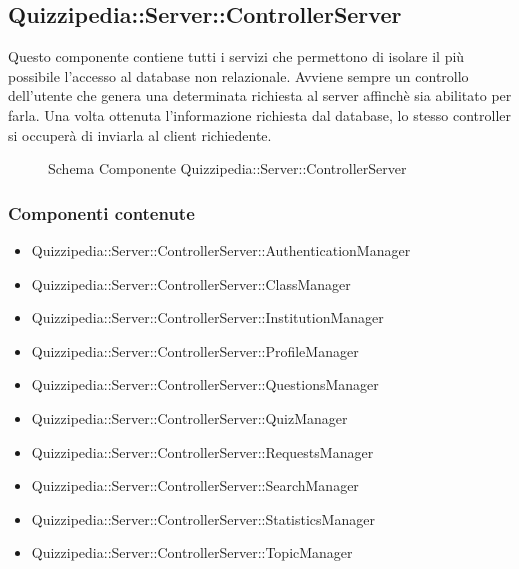 \subsection{Quizzipedia::Server::ControllerServer}
Questo componente contiene tutti i servizi che permettono di isolare il più possibile l'accesso al database non relazionale. Avviene sempre un controllo dell'utente che genera una determinata richiesta al server affinchè sia abilitato per farla. 
Una volta ottenuta l'informazione richiesta dal database, lo stesso controller si occuperà di inviarla al client richiedente.
\begin{figure}[H]
\centering
\noindent{}
\caption[Schema Componente Quizzipedia::Server::ControllerServer]{Schema Componente Quizzipedia::Server::ControllerServer}
\end{figure}
\subsubsection{Componenti contenute}
\begin{itemize}
\item Quizzipedia::Server::ControllerServer::AuthenticationManager
\item Quizzipedia::Server::ControllerServer::ClassManager
\item Quizzipedia::Server::ControllerServer::InstitutionManager
\item Quizzipedia::Server::ControllerServer::ProfileManager
\item Quizzipedia::Server::ControllerServer::QuestionsManager
\item Quizzipedia::Server::ControllerServer::QuizManager
\item Quizzipedia::Server::ControllerServer::RequestsManager
\item Quizzipedia::Server::ControllerServer::SearchManager
\item Quizzipedia::Server::ControllerServer::StatisticsManager
\item Quizzipedia::Server::ControllerServer::TopicManager
\end{itemize}
